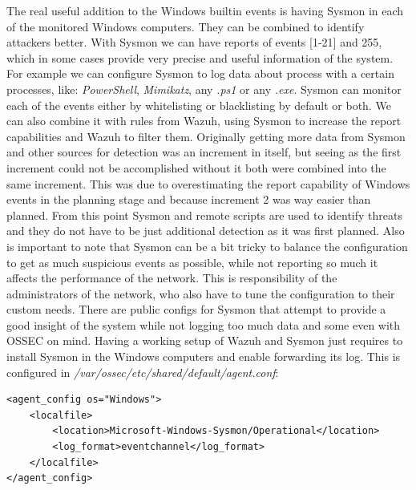 \linej
The real useful addition to the Windows builtin events is having Sysmon\cite{sysmon} in each of the monitored Windows computers. They can be combined to identify attackers better\cite{detection_events}.
\linej
With Sysmon we can have reports of events [1-21] and 255, which in some cases provide very precise and useful information of the system. For example we can configure Sysmon to log data about process with a certain processes, like: \textit{PowerShell}, \textit{Mimikatz}, any \textit{.ps1} or any \textit{.exe}.
Sysmon can monitor each of the events either by whitelisting or blacklisting by default or both. We can also combine it with rules from Wazuh, using Sysmon to increase the report capabilities and Wazuh to filter them.
\linej
\linej
\label{increment_explanation}
Originally getting more data from Sysmon and other sources for detection was an increment in itself, but seeing as the first increment could not be accomplished without it both were combined into the same increment.
This was due to overestimating the report capability of Windows events in the planning stage and because increment 2 was way easier than planned.
From this point Sysmon and remote scripts are used to identify threats and they do not have to be just additional detection as it was first planned.
\linej
\linej
Also is important to note that Sysmon can be a bit tricky to balance the configuration to get as much suspicious events as possible, while not reporting so much it affects the performance of the network. This is responsibility of the administrators of the network, who also have to tune the configuration to their custom needs.
There are public configs for Sysmon that attempt to provide a good insight of the system while not logging too much data\cite{sysmon_config} and some even with OSSEC on mind\cite{ossec_sysmon}.
\linej
\linej
Having a working setup of Wazuh and Sysmon just requires to install Sysmon in the Windows computers and enable forwarding its log. This is configured in \textit{/var/ossec/etc/shared/default/agent.conf}:
\begin{lstlisting}[style=xml]
<agent_config os="Windows">
	<localfile>
		<location>Microsoft-Windows-Sysmon/Operational</location>
		<log_format>eventchannel</log_format>
	</localfile>
</agent_config>
\end{lstlisting}

